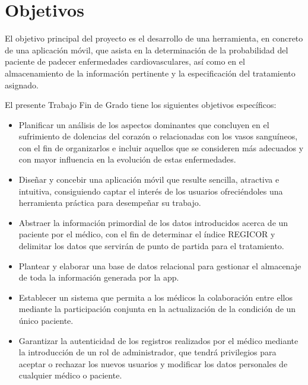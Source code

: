 \documentclass[11pt,spanish,
		listoftables,listoffigures]
		{tfgplantilla}
\begin{document}
\section{Objetivos}

El objetivo principal del proyecto es el desarrollo de una herramienta, en concreto de una aplicación móvil, que asista en la determinación de la probabilidad del paciente de padecer enfermedades cardiovasculares, así como en el almacenamiento de la información pertinente y la especificación del tratamiento asignado.

El presente Trabajo Fin de Grado tiene los siguientes objetivos específicos:

\begin{itemize}
    \item Planificar un análisis de los aspectos dominantes que concluyen en el sufrimiento de dolencias del corazón o relacionadas con los vasos sanguíneos, con el fin de organizarlos e incluir aquellos que se consideren más adecuados y con mayor influencia en la evolución de estas enfermedades.

    \item Diseñar y concebir una aplicación móvil que resulte sencilla, atractiva e intuitiva, consiguiendo captar el interés de los usuarios ofreciéndoles una herramienta práctica para desempeñar su trabajo.
    
    \item Abstraer la información primordial de los datos introducidos acerca de un paciente por el médico, con el fin de determinar el índice REGICOR y delimitar los datos que servirán de punto de partida para el tratamiento.
    
    \item Plantear y elaborar una base de datos relacional para gestionar el almacenaje de toda la información generada por la app. 
    
    \item Establecer un sistema que permita a los médicos la colaboración entre ellos mediante la participación conjunta en la actualización de la condición de un único paciente.
    
    \item Garantizar la autenticidad de los registros realizados por el médico mediante la introducción de un rol de administrador, que tendrá privilegios para aceptar o rechazar los nuevos usuarios y modificar los datos personales de cualquier médico o paciente. 
\end{itemize}
\end{document}
